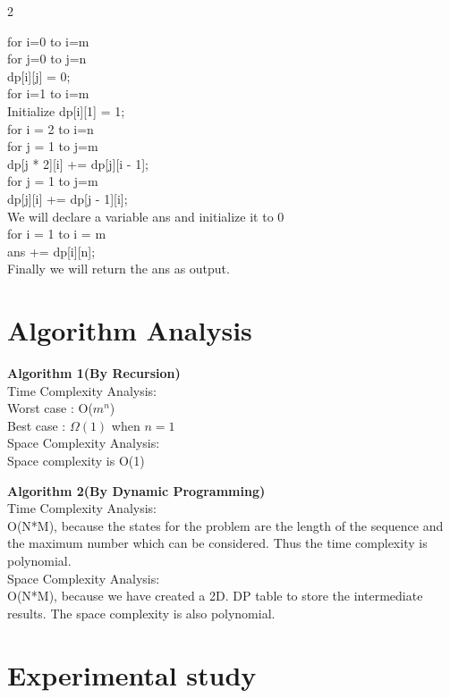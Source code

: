 2\documentclass[conference]{IEEEtran}
\newcommand\tab[1][1cm]{\hspace*{#1}}
\begin{document}
for   i=0 to i=m  \\
		\tab for  j=0 to j=n\\
			\tab \tab dp[i][j] = 0;\\
	
for  i=1 to i=m\\
		\tab Initialize dp[i][1] = 1; \\
	
for  i = 2 to i=n \\
		\tab for j = 1 to j=m\\
			\tab \tab dp[j * 2][i] += dp[j][i - 1];\\
		
		\tab for  j = 1 to j=m\\
			\tab \tab dp[j][i] += dp[j - 1][i];\\
		
	
We will declare a variable ans and initialize it to 0\\
	for i = 1 to i = m\\
		\tab ans += dp[i][n];\\
	
Finally we will return the ans as output.\\

\section{Algorithm Analysis}
\textbf{Algorithm 1(By Recursion)}\\
Time Complexity Analysis:\\
Worst case : O($\displaystyle{m}^{n}$)\\
Best case  : $\displaystyle\Omega{\left({1}\right)}$ when $ \displaystyle{n}={1}$\\
Space Complexity Analysis:\\
Space complexity is O(1)

\textbf{Algorithm 2(By Dynamic Programming)}\\
Time Complexity Analysis:\\
O(N*M), because the states for the problem are the length of the sequence and the maximum number which can be considered. Thus the time complexity is polynomial.\\
Space Complexity Analysis:\\
O(N*M), because we have created a 2D. DP table to store the intermediate results. The space complexity is also polynomial.

\section{Experimental study}
\end{document}
